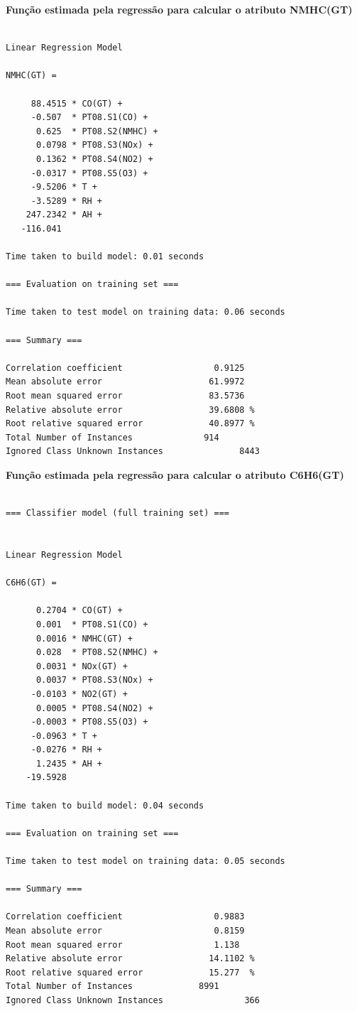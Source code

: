\noindent
\textbf{Função estimada pela regressão para calcular o atributo NMHC(GT)}

\begin{lstlisting}[frame=single]

Linear Regression Model

NMHC(GT) =

     88.4515 * CO(GT) +
     -0.507  * PT08.S1(CO) +
      0.625  * PT08.S2(NMHC) +
      0.0798 * PT08.S3(NOx) +
      0.1362 * PT08.S4(NO2) +
     -0.0317 * PT08.S5(O3) +
     -9.5206 * T +
     -3.5289 * RH +
    247.2342 * AH +
   -116.041 

Time taken to build model: 0.01 seconds

=== Evaluation on training set ===

Time taken to test model on training data: 0.06 seconds

=== Summary ===

Correlation coefficient                  0.9125
Mean absolute error                     61.9972
Root mean squared error                 83.5736
Relative absolute error                 39.6808 %
Root relative squared error             40.8977 %
Total Number of Instances              914     
Ignored Class Unknown Instances               8443       

\end{lstlisting}


\newpage


\textbf{Função estimada pela regressão para calcular o atributo C6H6(GT)}

\begin{lstlisting}[frame=single]

=== Classifier model (full training set) ===


Linear Regression Model

C6H6(GT) =

      0.2704 * CO(GT) +
      0.001  * PT08.S1(CO) +
      0.0016 * NMHC(GT) +
      0.028  * PT08.S2(NMHC) +
      0.0031 * NOx(GT) +
      0.0037 * PT08.S3(NOx) +
     -0.0103 * NO2(GT) +
      0.0005 * PT08.S4(NO2) +
     -0.0003 * PT08.S5(O3) +
     -0.0963 * T +
     -0.0276 * RH +
      1.2435 * AH +
    -19.5928

Time taken to build model: 0.04 seconds

=== Evaluation on training set ===

Time taken to test model on training data: 0.05 seconds

=== Summary ===

Correlation coefficient                  0.9883
Mean absolute error                      0.8159
Root mean squared error                  1.138 
Relative absolute error                 14.1102 %
Root relative squared error             15.277  %
Total Number of Instances             8991     
Ignored Class Unknown Instances                366     

\end{lstlisting}


